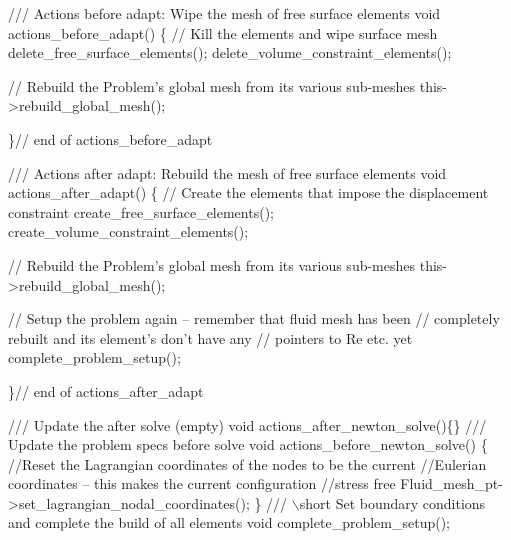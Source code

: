 \begin{DoxyCodeInclude}
 \textcolor{comment}{/// Actions before adapt: Wipe the mesh of free surface elements}
 \textcolor{keywordtype}{void} actions\_before\_adapt()
  \{
   \textcolor{comment}{// Kill the  elements and wipe surface mesh}
   delete\_free\_surface\_elements();
   delete\_volume\_constraint\_elements();

   \textcolor{comment}{// Rebuild the Problem's global mesh from its various sub-meshes}
   this->rebuild\_global\_mesh();
  
  \}\textcolor{comment}{// end of actions\_before\_adapt}

 \textcolor{comment}{}
\textcolor{comment}{ /// Actions after adapt: Rebuild the mesh of free surface elements}
\textcolor{comment}{} \textcolor{keywordtype}{void} actions\_after\_adapt()
  \{
   \textcolor{comment}{// Create the elements that impose the displacement constraint }
   create\_free\_surface\_elements();
   create\_volume\_constraint\_elements();
   
   \textcolor{comment}{// Rebuild the Problem's global mesh from its various sub-meshes}
   this->rebuild\_global\_mesh();
   
   \textcolor{comment}{// Setup the problem again -- remember that fluid mesh has been}
   \textcolor{comment}{// completely rebuilt and its element's don't have any}
   \textcolor{comment}{// pointers to Re etc. yet}
   complete\_problem\_setup();

  \}\textcolor{comment}{// end of actions\_after\_adapt}

 \textcolor{comment}{}
\textcolor{comment}{ /// Update the after solve (empty)}
\textcolor{comment}{} \textcolor{keywordtype}{void} actions\_after\_newton\_solve()\{\}
\textcolor{comment}{}
\textcolor{comment}{ /// Update the problem specs before solve}
\textcolor{comment}{} \textcolor{keywordtype}{void} actions\_before\_newton\_solve()
  \{
   \textcolor{comment}{//Reset the Lagrangian coordinates of the nodes to be the current}
   \textcolor{comment}{//Eulerian coordinates -- this makes the current configuration}
   \textcolor{comment}{//stress free}
   Fluid\_mesh\_pt->set\_lagrangian\_nodal\_coordinates();
  \}
 \textcolor{comment}{}
\textcolor{comment}{ /// \(\backslash\)short Set boundary conditions and complete the build of all elements}
\textcolor{comment}{} \textcolor{keywordtype}{void} complete\_problem\_setup();

\end{DoxyCodeInclude}



